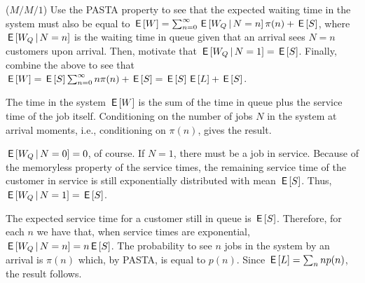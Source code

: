 \begin{comment}
\begin{exercise}[use=false]
  As a challenge you can try to derive \eqref{eq:24} by means of sample path arguments.
  \begin{solution}
    \TBD
  \end{solution}
\end{exercise}
\end{comment}




\begin{exercise}($M/M/1$)
  Use the PASTA property to see that the expected waiting time in the
  system must also be equal to
  $\,\mathsf{E}\left[W\right] = \sum_{n=0}^\infty \,\mathsf{E}\left[W_Q \,\middle|\, N=n\right] \pi(n) + \,\mathsf{E}\left[S\right]$, 
where $\,\mathsf{E}\left[W_Q \,\middle|\, N=n\right]$ is the waiting time in queue given that an
arrival sees $N=n$ customers upon arrival. Then, 
 motivate that $\,\mathsf{E}\left[W_Q \,\middle|\, N=1\right] = \,\mathsf{E}\left[S\right]$. Finally, combine the above to see that 
$\,\mathsf{E}\left[W\right] = \,\mathsf{E}\left[S\right] \sum_{n=0}^\infty n \pi(n) + \,\mathsf{E}\left[S\right] = \,\mathsf{E}\left[S\right] \,\mathsf{E}\left[L\right] + \,\mathsf{E}\left[S\right]$.
  \begin{solution}
 The time in the system $\,\mathsf{E}\left[W\right]$ is the sum of the time in
      queue plus the service time of the job itself.  Conditioning on
      the number of jobs $N$ in the system at arrival moments, i.e.,
      conditioning on $\pi(n)$, gives the result.  

 $\,\mathsf{E}\left[W_Q\,\middle|\, N=0\right]=0$, of course. If $N=1$, there must be a job
      in service.  Because of the memoryless property of the service
      times, the remaining service time of the customer in service is
      still exponentially distributed with mean $\,\mathsf{E}\left[S\right]$. Thus,
      $\,\mathsf{E}\left[W_Q\,\middle|\, N=1\right]=\,\mathsf{E}\left[S\right]$. 

 The expected service time for a customer still in queue is
      $\,\mathsf{E}\left[S\right]$.  Therefore, for each $n$ we have that, when service
      times are exponential, $\,\mathsf{E}\left[W_Q\,\middle|\, N=n\right]= n \,\mathsf{E}\left[S\right]$. The probability
      to see $n$ jobs in the system by an arrival is $\pi(n)$ which,
      by PASTA, is equal to $p(n)$. Since $\,\mathsf{E}\left[L\right] = \sum_n n p(n)$, the
      result follows.
  \end{solution}
\end{exercise}

